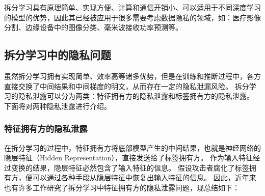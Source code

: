 拆分学习具有原理简单、实现方便、计算和通信开销小、可以适用于不同深度学习的模型的优势，因此其已经被应用于很多需要考虑数据隐私的领域，如：医疗影像分割\cite{roth2022split_unet}、边缘设备中的图像分类\cite{fagbohungbe2022split_edge_image,palanisamy2021spliteasy}、毫米波接收功率预测\cite{koda2020split_mmwave}等。

\subsection{拆分学习中的隐私问题}
虽然拆分学习拥有实现简单、效率高等诸多优势，但是在训练和推断过程中，各方直接交换了中间结果和中间梯度的明文，从而存在一定的隐私泄漏风险。
%
拆分学习的隐私泄露可以分为两类：特征拥有方的隐私泄露和标签拥有方的隐私泄露。
%
下面将对两种隐私泄露进行介绍。
%
\subsubsection{特征拥有方的隐私泄露}
在拆分学习的过程中，特征拥有方将底部模型产生的中间结果，也就是神经网络的隐层特征（Hidden Representation），直接发送给了标签拥有方。
%
作为输入特征经过变换的结果，隐层特征必然包含了输入特征的信息。
%
假设攻击者腐化了标签拥有方，便可以通过各种手段从隐层特征中恢复出输入特征的信息。
因此，近年来也有许多工作研究了拆分学习中特征拥有方的隐私泄露问题，现总结如下：
%
